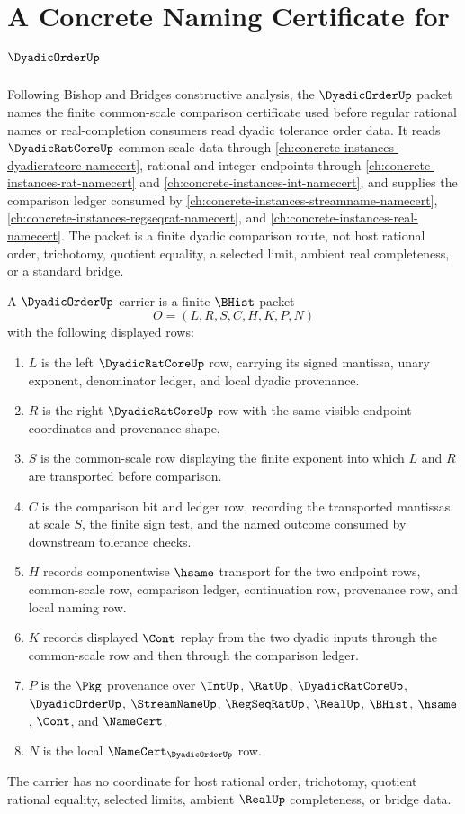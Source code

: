 \chapter{A Concrete Naming Certificate for $\DyadicOrderUp$}
\label{ch:concrete-instances-dyadic-order-namecert}

Following Bishop and Bridges constructive analysis, the $\DyadicOrderUp$ packet names the finite common-scale comparison certificate used before regular rational names or real-completion consumers read dyadic tolerance order data. It reads $\DyadicRatCoreUp$ common-scale data through \autoref{ch:concrete-instances-dyadicratcore-namecert}, rational and integer endpoints through \autoref{ch:concrete-instances-rat-namecert} and \autoref{ch:concrete-instances-int-namecert}, and supplies the comparison ledger consumed by \autoref{ch:concrete-instances-streamname-namecert}, \autoref{ch:concrete-instances-regseqrat-namecert}, and \autoref{ch:concrete-instances-real-namecert}. The packet is a finite dyadic comparison route, not host rational order, trichotomy, quotient equality, a selected limit, ambient real completeness, or a standard bridge.

\begin{definition}
\label{def:dyadic-order-carrier}
A $\DyadicOrderUp$ carrier is a finite $\BHist$ packet
$$
O=(L,R,S,C,H,K,P,N)
$$
with the following displayed rows:
\begin{enumerate}
\item $L$ is the left $\DyadicRatCoreUp$ row, carrying its signed mantissa, unary exponent, denominator ledger, and local dyadic provenance.
\item $R$ is the right $\DyadicRatCoreUp$ row with the same visible endpoint coordinates and provenance shape.
\item $S$ is the common-scale row displaying the finite exponent into which $L$ and $R$ are transported before comparison.
\item $C$ is the comparison bit and ledger row, recording the transported mantissas at scale $S$, the finite sign test, and the named outcome consumed by downstream tolerance checks.
\item $H$ records componentwise $\hsame$ transport for the two endpoint rows, common-scale row, comparison ledger, continuation row, provenance row, and local naming row.
\item $K$ records displayed $\Cont$ replay from the two dyadic inputs through the common-scale row and then through the comparison ledger.
\item $P$ is the $\Pkg$ provenance over $\IntUp$, $\RatUp$, $\DyadicRatCoreUp$, $\DyadicOrderUp$, $\StreamNameUp$, $\RegSeqRatUp$, $\RealUp$, $\BHist$, $\hsame$, $\Cont$, and $\NameCert$.
\item $N$ is the local $\NameCert_{\DyadicOrderUp}$ row.
\end{enumerate}
The carrier has no coordinate for host rational order, trichotomy, quotient rational equality, selected limits, ambient $\RealUp$ completeness, or bridge data.
\end{definition}

